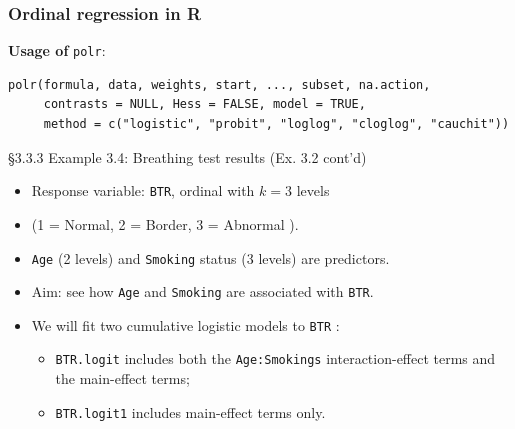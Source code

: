 \documentclass{beamer}
\newenvironment{wideitemize}%
  {\begin{itemize}%
    \setlength{\parskip}{1em}}%
  {\end{itemize}}
\begin{document}
\begin{frame}[fragile] \frametitle{Ordinal regression in R}
\textbf{Usage of} \texttt{polr}: {\footnotesize
\begin{verbatim}
polr(formula, data, weights, start, ..., subset, na.action,
     contrasts = NULL, Hess = FALSE, model = TRUE,
     method = c("logistic", "probit", "loglog", "cloglog", "cauchit"))
\end{verbatim}}

\end{frame}


\begin{frame}{\S3.3.3 Example 3.4: Breathing test results  (Ex. 3.2 cont'd)}
\begin{wideitemize}
\item
Response variable: \texttt{BTR}, ordinal with $k=3$ levels 

\item (1 = Normal, 2 = Border, 3 = Abnormal ).
\item
\texttt{Age} (2 levels) and \texttt{Smoking} status (3 levels) are predictors.
\item
Aim: see how \texttt{Age} and \texttt{Smoking} are associated with \texttt{BTR}.
\item 
We  will fit two cumulative logistic models to \texttt{BTR} :

\begin{wideitemize}

\item  \texttt{BTR.logit} includes both the \texttt{Age:Smokings} 
interaction-effect terms and  the main-effect terms; 
\item \texttt{BTR.logit1}
includes main-effect terms only.
\end{wideitemize}
\end{wideitemize}


\end{frame}
\end{document}
